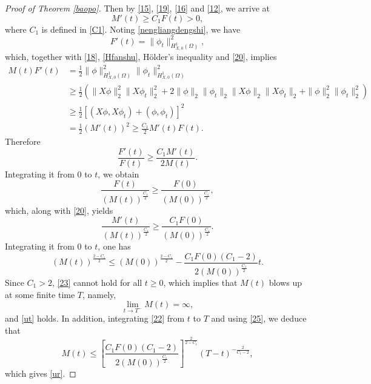 \documentclass[11pt,a4paper]{article}
\numberwithin{equation}{section}
\numberwithin{remark}{section}
\begin{document}
\begin{proof}[Proof of Theorem \ref{baopo}]
Then by \eqref{15}, \eqref{19}, \eqref{16} and \eqref{12}, we arrive at
\begin{equation}\label{20}
M'(t)\geq C_1F(t)>0,
\end{equation}
where $C_1$ is defined in \eqref{C1}.
Noting  \eqref{nengliangdengshi}, we have
\begin{equation*}
F'(t)=\|\phi_t\|_{H_{X,0}^1(\Omega)}^2,
\end{equation*}
which, together with \eqref{18}, \eqref{Hfanshu}, H\"{o}lder's inequality and \eqref{20}, implies
\begin{equation*}\begin{split}
M(t)F'(t)&=\frac{1}{2}\|\phi\|_{H_{X,0}^1(\Omega)}^2\|\phi_t\|_{H_{X,0}^1(\Omega)}^2\\
&\geq\frac{1}{2}\left(\|X\phi\|_2^2\|X\phi_t\|_2^2+2\|\phi\|_2\|\phi_t\|_2\|X\phi\|_2\|X\phi_t\|_2
               +\|\phi\|_2^2\|\phi_t\|_2^2\right)\\
&\geq\frac{1}{2}\left[(X\phi,X\phi_t)+(\phi,\phi_t)\right]^2\\
&=\frac{1}{2}(M'(t))^2\geq\frac{C_1}{2}M'(t)F(t).
\end{split}\end{equation*}
Therefore
\begin{equation*}
\frac{F'(t)}{F(t)}\geq\frac{C_1M'(t)}{2M(t)}.
\end{equation*}
Integrating it from $0$ to $t$, we obtain
\begin{equation*}
\frac{F(t)}{(M(t))^{\frac{C_1}{2}}}\geq\frac{F(0)}{(M(0))^{\frac{C_1}{2}}},
\end{equation*}
which, along with \eqref{20}, yields
\begin{equation}\label{22}
\frac{M'(t)}{(M(t))^{\frac{C_1}{2}}}\geq\frac{C_1F(0)}{(M(0))^{\frac{C_1}{2}}}.
\end{equation}
Integrating it from $0$ to $t$, one has
\begin{equation}\label{23}
(M(t))^{\frac{2-C_1}{2}}\leq(M(0))^{\frac{2-C_1}{2}}-\frac{C_1F(0)(C_1-2)}{2(M(0))^{\frac{C_1}{2}}}t.
\end{equation}
Since $C_1>2$, \eqref{23} cannot hold for all $t\geq0$, which implies that $M(t)$ blows up at some finite time $T$, namely,
\begin{equation}\label{25}
\lim_{t\rightarrow T^-}M(t)=\infty,
\end{equation}
and \eqref{ut} holds.
In addition, integrating \eqref{22} from $t$ to $T$ and using \eqref{25}, we deduce that
\begin{equation*}
M(t)\leq\left[\frac{C_1F(0)(C_1-2)}{2(M(0))^{\frac{C_1}{2}}}\right]^{\frac{2}{2-C_1}}(T-t)^{-\frac{2}{C_1-2}},
\end{equation*}
which gives \eqref{ur}.



\end{proof}
\end{document}
